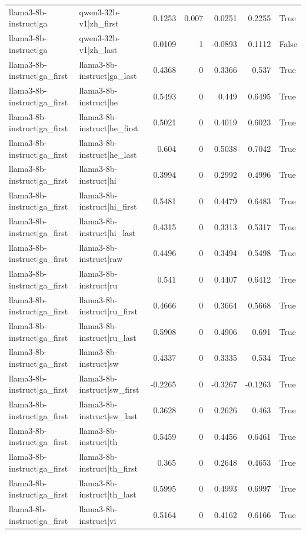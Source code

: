 \begin{table}
\begin{tabular}{l l r r r r l}
llama3-8b-instruct|ga & qwen3-32b-v1|zh_first & 0.1253 & 0.007 & 0.0251 & 0.2255 & True \\
llama3-8b-instruct|ga & qwen3-32b-v1|zh_last & 0.0109 & 1 & -0.0893 & 0.1112 & False \\
llama3-8b-instruct|ga_first & llama3-8b-instruct|ga_last & 0.4368 & 0 & 0.3366 & 0.537 & True \\
llama3-8b-instruct|ga_first & llama3-8b-instruct|he & 0.5493 & 0 & 0.449 & 0.6495 & True \\
llama3-8b-instruct|ga_first & llama3-8b-instruct|he_first & 0.5021 & 0 & 0.4019 & 0.6023 & True \\
llama3-8b-instruct|ga_first & llama3-8b-instruct|he_last & 0.604 & 0 & 0.5038 & 0.7042 & True \\
llama3-8b-instruct|ga_first & llama3-8b-instruct|hi & 0.3994 & 0 & 0.2992 & 0.4996 & True \\
llama3-8b-instruct|ga_first & llama3-8b-instruct|hi_first & 0.5481 & 0 & 0.4479 & 0.6483 & True \\
llama3-8b-instruct|ga_first & llama3-8b-instruct|hi_last & 0.4315 & 0 & 0.3313 & 0.5317 & True \\
llama3-8b-instruct|ga_first & llama3-8b-instruct|raw & 0.4496 & 0 & 0.3494 & 0.5498 & True \\
llama3-8b-instruct|ga_first & llama3-8b-instruct|ru & 0.541 & 0 & 0.4407 & 0.6412 & True \\
llama3-8b-instruct|ga_first & llama3-8b-instruct|ru_first & 0.4666 & 0 & 0.3664 & 0.5668 & True \\
llama3-8b-instruct|ga_first & llama3-8b-instruct|ru_last & 0.5908 & 0 & 0.4906 & 0.691 & True \\
llama3-8b-instruct|ga_first & llama3-8b-instruct|sw & 0.4337 & 0 & 0.3335 & 0.534 & True \\
llama3-8b-instruct|ga_first & llama3-8b-instruct|sw_first & -0.2265 & 0 & -0.3267 & -0.1263 & True \\
llama3-8b-instruct|ga_first & llama3-8b-instruct|sw_last & 0.3628 & 0 & 0.2626 & 0.463 & True \\
llama3-8b-instruct|ga_first & llama3-8b-instruct|th & 0.5459 & 0 & 0.4456 & 0.6461 & True \\
llama3-8b-instruct|ga_first & llama3-8b-instruct|th_first & 0.365 & 0 & 0.2648 & 0.4653 & True \\
llama3-8b-instruct|ga_first & llama3-8b-instruct|th_last & 0.5995 & 0 & 0.4993 & 0.6997 & True \\
llama3-8b-instruct|ga_first & llama3-8b-instruct|vi & 0.5164 & 0 & 0.4162 & 0.6166 & True \\

\end{tabular}
\end{table}
